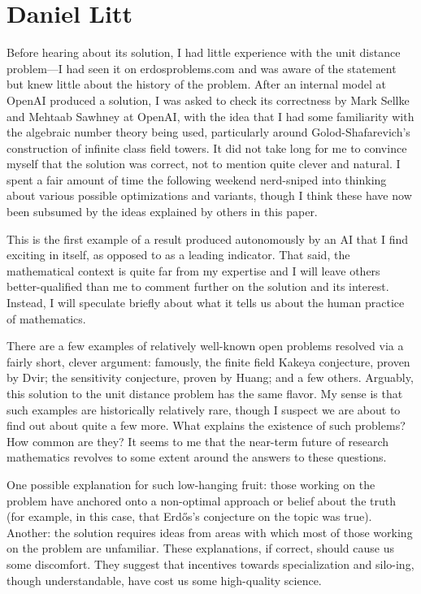 \documentclass[11pt,reqno]{amsart}
\numberwithin{equation}{section}
\theoremstyle{definition}
\theoremstyle{remark}
\begin{document}
\section{Daniel Litt}
Before hearing about its solution, I had little experience with the unit distance problem—I had seen it on erdosproblems.com and was aware of the statement but knew little about the history of the problem. After an internal model at OpenAI produced a solution, I was asked to check its correctness by Mark Sellke and Mehtaab Sawhney at OpenAI, with the idea that I had some familiarity with the algebraic number theory being used, particularly around Golod-Shafarevich’s construction of infinite class field towers. It did not take long for me to convince myself that the solution was correct, not to mention quite clever and natural. I spent a fair amount of time the following weekend nerd-sniped into thinking about various possible optimizations and variants, though I think these have now been subsumed by the ideas explained by others in this paper. 

This is the first example of a result produced autonomously by an AI that I find exciting in itself, as opposed to as a leading indicator. That said, the mathematical context is quite far from my expertise and I will leave others better-qualified than me to comment further on the solution and its interest. Instead, I will speculate briefly about what it tells us about the human practice of mathematics.

There are a few examples of relatively well-known open problems resolved via a fairly short, clever argument: famously, the finite field Kakeya conjecture, proven by Dvir; the sensitivity conjecture, proven by Huang; and a few others. Arguably, this solution to the unit distance problem has the same flavor. My sense is that such examples are historically relatively rare, though I suspect we are about to find out about quite a few more. What explains the existence of such problems? How common are they? It seems to me that the near-term future of research mathematics revolves to some extent around the answers to these questions.

One possible explanation for such low-hanging fruit: those working on the problem have anchored onto a non-optimal approach or belief about the truth (for example, in this case, that Erd\H{o}s’s conjecture on the topic was true). Another: the solution requires ideas from areas with which most of those working on the problem are unfamiliar. These explanations, if correct, should cause us some discomfort. They suggest that incentives towards specialization and silo-ing, though understandable, have cost us some high-quality science.
\end{document}
